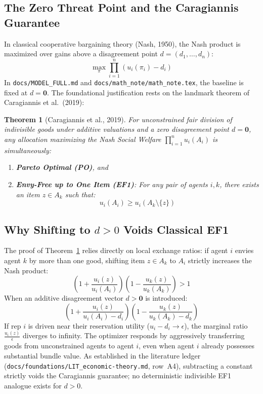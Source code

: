 \documentclass[11pt,a4paper]{article}
\theoremstyle{plain}
\newtheorem{theorem}{Theorem}
\theoremstyle{definition}
\begin{document}
\subsection{The Zero Threat Point and the Caragiannis Guarantee}
In classical cooperative bargaining theory (Nash, 1950), the Nash product is maximized over gains above a disagreement point $d = (d_1, \dots, d_n)$:
\begin{equation}
    \max_{\pi} \prod_{i=1}^n (u_i(\pi_i) - d_i)
\end{equation}
In \texttt{docs/MODEL\_FULL.md} and \texttt{docs/math\_note/math\_note.tex}, the baseline is fixed at $d = \mathbf{0}$. The foundational justification rests on the landmark theorem of Caragiannis et al.~(2019):
\begin{theorem}[Caragiannis et al., 2019]\label{thm:caragiannis}
For unconstrained fair division of indivisible goods under additive valuations and a zero disagreement point $d = \mathbf{0}$, any allocation maximizing the Nash Social Welfare $\prod_{i=1}^n u_i(A_i)$ is simultaneously:
\begin{enumerate}[leftmargin=1.5em]
    \item \textbf{Pareto Optimal (PO)}, and
    \item \textbf{Envy-Free up to One Item (EF1)}: For any pair of agents $i, k$, there exists an item $z \in A_k$ such that:
    \begin{equation}
    u_i(A_i) \ge u_i(A_k \setminus \{z\})
    \end{equation}
\end{enumerate}
\end{theorem}

\subsection{Why Shifting to \texorpdfstring{$d > 0$}{d > 0} Voids Classical EF1}
The proof of Theorem~\ref{thm:caragiannis} relies directly on local exchange ratios: if agent $i$ envies agent $k$ by more than one good, shifting item $z \in A_k$ to $A_i$ strictly increases the Nash product:
\begin{equation}
    \left( 1 + \frac{u_i(z)}{u_i(A_i)} \right) \left( 1 - \frac{u_k(z)}{u_k(A_k)} \right) > 1
\end{equation}
When an additive disagreement vector $d > \mathbf{0}$ is introduced:
\begin{equation}
    \left( 1 + \frac{u_i(z)}{u_i(A_i) - d_i} \right) \left( 1 - \frac{u_k(z)}{u_k(A_k) - d_k} \right)
\end{equation}
If rep $i$ is driven near their reservation utility ($u_i - d_i \to \epsilon$), the marginal ratio $\frac{u_i(z)}{\epsilon}$ diverges to infinity. The optimizer responds by aggressively transferring goods from unconstrained agents to agent $i$, even when agent $i$ already possesses substantial bundle value. As established in the literature ledger (\texttt{docs/foundations/LIT\_economic-theory.md}, row~A4), subtracting a constant strictly voids the Caragiannis guarantee; no deterministic indivisible EF1 analogue exists for $d > 0$.
\end{document}
